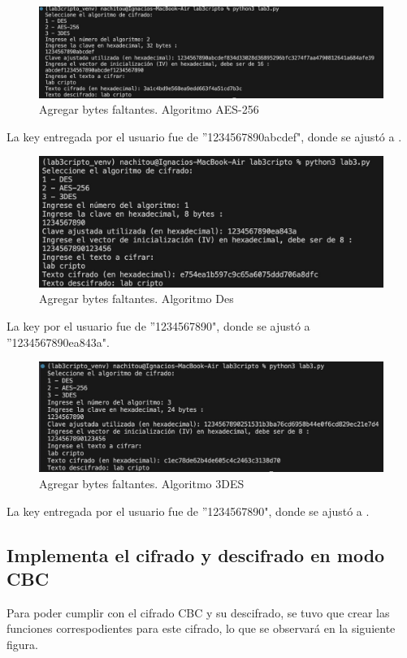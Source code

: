\documentclass[letter,12pt]{article}
\begin{document}
\begin{figure}[H]
    \centering
    \includegraphics[width=0.8\linewidth]{imagenes/aes generar.jpg}
    \caption{Agregar bytes faltantes. Algoritmo AES-256}
    \label{fig:enter-label}
\end{figure}
La key entregada por el usuario fue de ''1234567890abcdef", donde se ajustó a .

\begin{figure}[H]
    \centering
    \includegraphics[width=0.8\linewidth]{imagenes/des generar.jpg}
    \caption{Agregar bytes faltantes. Algoritmo Des}
    \label{fig:enter-label}
\end{figure}

La key por el usuario fue de ''1234567890", donde se ajustó a ''1234567890ea843a".

\begin{figure}[H]
    \centering
    \includegraphics[width=0.8\linewidth]{imagenes/3des generar.jpg}
    \caption{Agregar bytes faltantes. Algoritmo 3DES}
    \label{fig:enter-label}
\end{figure}

La key entregada por el usuario fue de ''1234567890", donde se ajustó a .


\subsection{Implementa el cifrado y descifrado en modo CBC}
Para poder cumplir con el cifrado CBC y su descifrado, se tuvo que crear las funciones correspodientes para este cifrado, lo que se observará en la siguiente figura.
\end{document}
